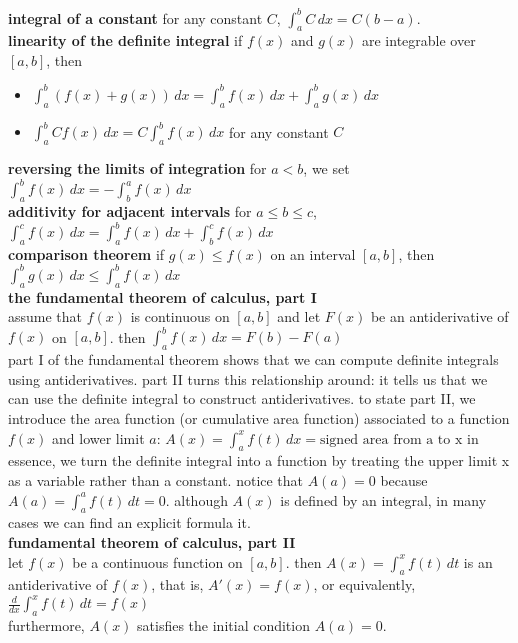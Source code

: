 \documentclass{article}
\begin{document}
\textbf{integral of a constant} for any constant $C$, $\int_{a}^{b}C\,dx = C(b - a)$.\\

\textbf{linearity of the definite integral} if $f(x)$ and $g(x)$ are integrable over $[a, b]$, then
	\begin{itemize}
		\item $\int_{a}^{b}(f(x) + g(x))\,dx = \int_{a}^{b}f(x)\,dx + \int_{a}^{b}g(x)\,dx$
		\item $\int_{a}^{b}Cf(x)\,dx = C\int_{a}^{b}f(x)\,dx$ for any constant $C$
	\end{itemize}

\textbf{reversing the limits of integration} for $a < b$, we set $\int_{a}^{b}f(x)\,dx = -\int_{b}^{a}f(x)\,dx$\\

\textbf{additivity for adjacent intervals} for $a \leq b \leq c$,\\
$ \int_{a}^{c}f(x)\,dx  = \int_{a}^{b}f(x)\,dx + \int_{b}^{c}f(x)\,dx$\\

\textbf{comparison theorem} if $g(x) \leq f(x)$ on an interval $[a, b]$, then\\
$\int_{a}^{b}g(x)\,dx \leq \int_{a}^{b}f(x)\,dx$\\

\textbf{the fundamental theorem of calculus, part I}\\
assume that $f(x)$ is continuous on $[a, b]$ and let $F(x)$ be an antiderivative of $f(x)$ on $[a, b]$. then $\int_{a}^{b}f(x)\,dx = F(b) - F(a)$\\

part I of the fundamental theorem shows that we can compute definite integrals using antiderivatives. part II turns this relationship around: it tells us that we can use the definite integral to construct antiderivatives. to state part II, we introduce the area function (or cumulative area function) associated to a function $f(x)$ and lower limit $a$: $A(x) = \int_{a}^{x}f(t)\, dx = \text{signed area from a to x}$ in essence, we turn the definite integral into a function by treating the upper limit x as a variable rather than a constant. notice that $A(a) = 0$ because $A(a) = \int_{a}^{a}f(t)\,dt = 0$. although $A(x)$ is defined by an integral, in many cases we can find an explicit formula it.\\

\textbf{fundamental theorem of calculus, part II}\\
let $f(x)$ be a continuous function on $[a, b]$. then $A(x) = \int_{a}^{x}f(t)\, dt$ is an antiderivative of $f(x)$, that is, $A'(x) = f(x)$, or equivalently,\\
$\frac{d}{dx}\int_{a}^{x}f(t)\,dt = f(x)$\\
furthermore, $A(x)$ satisfies the initial condition $A(a) = 0$.\\
\end{document}
